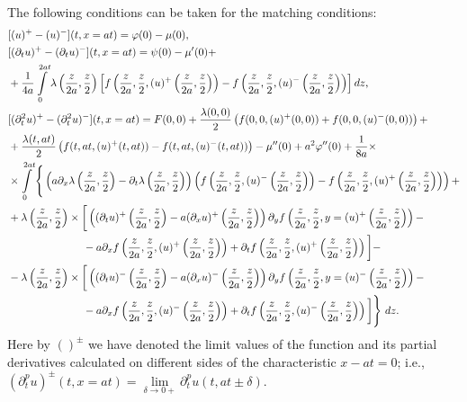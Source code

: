 \documentclass[12pt]{llncs}
\begin{document}
The following conditions can be taken for the matching conditions:
\begingroup
\allowdisplaybreaks
\begin{align}\label{korzyuk_usl_sop}
    &[(u)^+ - (u)^-](t, x = a t) = \varphi(0) - \mu(0),  \notag \\ 
    &[(\partial_t u)^+ - (\partial_t u)^-](t, x = a t) = \psi(0) - \mu'(0) + \notag \\ &+ \frac{1}{4 a} \int\limits_{0}^{2 a t} \lambda \left(\frac{z}{2 a},\frac{z}{2}\right) \left[ f\left(\frac{z}{2 a},\frac{z}{2},(u)^+\left(\frac{z}{2
    a},\frac{z}{2}\right)\right)-f\left(\frac{z}{2 a},\frac{z}{2},(u)^-\left(\frac{z}{2
    a},\frac{z}{2}\right)\right)\right] dz, \notag \\
    &[(\partial_t^2 u)^+ - (\partial_t^2 u)^-](t, x = a t) = F(0, 0) + \frac{\lambda(0, 0)}{2} \left( f(0, 0, (u)^+(0, 0)) + f(0, 0, (u)^-(0, 0)) \right) + \notag \\ &+ 
    \frac{\lambda(t, a t)}{2} \left(f(t, a t, (u)^+(t, a t)) - f(t, a t, (u)^-(t, a t)) \right) - \mu''(0) + a^2 \varphi''(0) + \frac{1}{8 a} \times \notag \\
    &\times \int\limits_0^{2 a t} \Bigg\{ \left(a \partial_x \lambda \left(\frac{z}{2 a},\frac{z}{2}\right)-\partial_t \lambda \left(\frac{z}{2
    a},\frac{z}{2}\right)\right) \left( f\left(\frac{z}{2 a},\frac{z}{2},(u)^-\left(\frac{z}{2
    a},\frac{z}{2}\right)\right) - f\left(\frac{z}{2 a},\frac{z}{2},(u)^+\left(\frac{z}{2
    a},\frac{z}{2}\right)\right)\right) + \notag \\ 
    &+\lambda \left(\frac{z}{2 a},\frac{z}{2}\right) \times \bigg[ \left((\partial_t u)^+\left(\frac{z}{2 a},\frac{z}{2}\right)-a (\partial_x u)^+\left(\frac{z}{2
    a},\frac{z}{2}\right)\right) \partial_y f\left(\frac{z}{2
    a},\frac{z}{2},y = (u)^+\left(\frac{z}{2 a},\frac{z}{2}\right)\right)-\notag \\ & \quad\quad\quad\quad\quad\quad\quad - a
    \partial_x f\left(\frac{z}{2 a},\frac{z}{2},(u)^+\left(\frac{z}{2
    a},\frac{z}{2}\right)\right)+\partial_t f\left(\frac{z}{2
    a},\frac{z}{2},(u)^+\left(\frac{z}{2 a},\frac{z}{2}\right)\right) \bigg] - \notag \\
    &-\lambda \left(\frac{z}{2 a},\frac{z}{2}\right) \times \bigg[ \left((\partial_t u)^-\left(\frac{z}{2 a},\frac{z}{2}\right)-a (\partial_x u)^-\left(\frac{z}{2
    a},\frac{z}{2}\right)\right) \partial_y f\left(\frac{z}{2
    a},\frac{z}{2},y = (u)^-\left(\frac{z}{2 a},\frac{z}{2}\right)\right)-\notag \\ & \quad\quad\quad\quad\quad\quad\quad - a
    \partial_x f\left(\frac{z}{2 a},\frac{z}{2},(u)^-\left(\frac{z}{2
    a},\frac{z}{2}\right)\right)+\partial_t f\left(\frac{z}{2
    a},\frac{z}{2},(u)^-\left(\frac{z}{2 a},\frac{z}{2}\right)\right) \bigg] \Bigg\} \ dz.
\end{align}
\endgroup
Here by $()^\pm$ we have denoted the limit values of the function and its partial derivatives calculated on different sides of the characteristic $x - a t = 0$; i.e., $(\partial_t^p u)^\pm(t, x = a t) = \lim\limits_{\delta \to 0+} \partial_t^p u (t, a t \pm \delta)$. 
\end{document}
